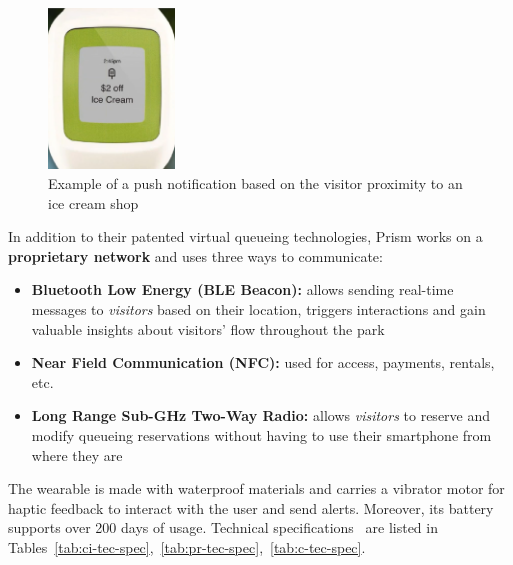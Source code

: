 \begin{figure}[H]
    \centering
    \includegraphics[width=0.3\textwidth]{img/prism-icecream}
    \caption{Example of a push notification based on the visitor proximity to an ice cream shop}
    \label{fig:prism-icecream}
\end{figure}

In addition to their patented virtual queueing technologies, Prism works on a \textbf{proprietary network} and uses three ways to communicate:
\begin{itemize}
    \item \textbf{Bluetooth Low Energy (BLE Beacon):} allows sending real-time messages to \textit{visitors} based on their location, triggers interactions and gain valuable insights about visitors' flow throughout the park
    \item \textbf{Near Field Communication (NFC):} used for access, payments, rentals, etc.
    \item \textbf{Long Range Sub-GHz Two-Way Radio:} allows \textit{visitors} to reserve and modify queueing reservations without having to use their smartphone from where they are
\end{itemize}

The wearable is made with waterproof materials and carries a vibrator motor for haptic feedback to interact with the user and send alerts.
Moreover, its battery supports over 200 days of usage.
Technical specifications~\cite{prism-manual} are listed in Tables~\ref{tab:ci-tec-spec},~\ref{tab:pr-tec-spec},~\ref{tab:c-tec-spec}.

